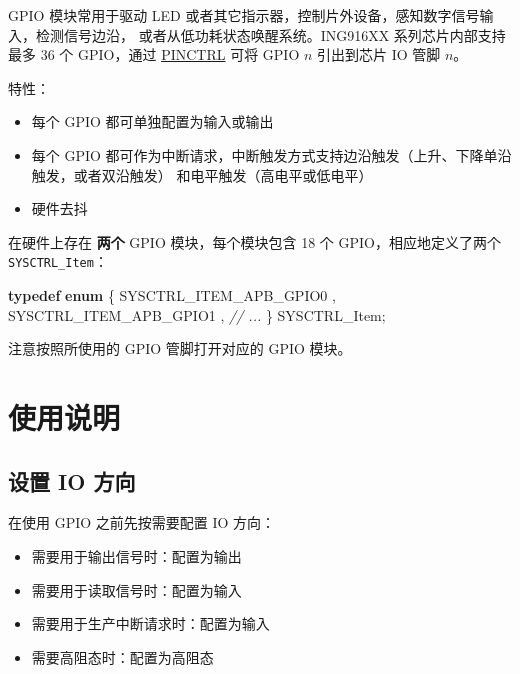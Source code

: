 \documentclass[
  12pt,
]{book}
\makeatletter
\newenvironment{Shaded}{\begin{snugshade}}{\end{snugshade}}
\newcommand{\CommentTok}[1]{\textcolor[rgb]{0.56,0.35,0.01}{\textit{#1}}}
\newcommand{\KeywordTok}[1]{\textcolor[rgb]{0.13,0.29,0.53}{\textbf{#1}}}
\newcommand{\NormalTok}[1]{#1}
\providecommand{\tightlist}{%
  \setlength{\itemsep}{0pt}\setlength{\parskip}{0pt}}
\newenvironment{kframe}{%
\medskip{}
\setlength{\fboxsep}{.8em}
 \def\at@end@of@kframe{}%
 \ifinner\ifhmode%
  \def\at@end@of@kframe{\end{minipage}}%
  \begin{minipage}{\columnwidth}%
 \fi\fi%
 \def\FrameCommand##1{\hskip\@totalleftmargin \hskip-\fboxsep
 \colorbox{shadecolor}{##1}\hskip-\fboxsep
     \hskip-\linewidth \hskip-\@totalleftmargin \hskip\columnwidth}%
 \MakeFramed {\advance\hsize-\width
   \@totalleftmargin\z@ \linewidth\hsize
   \@setminipage}}%
 {\par\unskip\endMakeFramed%
 \at@end@of@kframe}
\newenvironment{rmdblock}[1]
  {
  \begin{itemize}
  \renewcommand{\labelitemi}{
    \raisebox{-.7\height}[0pt][0pt]{
      {\setkeys{Gin}{width=3em,keepaspectratio}\texttt{[image: images/\#1]}}
    }
  }
  \setlength{\fboxsep}{1em}
  \begin{kframe}
  \item
  }
  {
  \end{kframe}
  \end{itemize}
  }
\newenvironment{rmdcaution}
  {\begin{rmdblock}{caution}}
  {\end{rmdblock}}
\makeatother
\begin{document}
GPIO 模块常用于驱动 LED 或者其它指示器，控制片外设备，感知数字信号输入，检测信号边沿，
或者从低功耗状态唤醒系统。ING916XX 系列芯片内部支持最多 36 个 GPIO，通过 \protect\hyperlink{ch-pinctrl}{PINCTRL}
可将 GPIO \(n\) 引出到芯片 IO 管脚 \(n\)。

特性：

\begin{itemize}
\tightlist
\item
  每个 GPIO 都可单独配置为输入或输出
\item
  每个 GPIO 都可作为中断请求，中断触发方式支持边沿触发（上升、下降单沿触发，或者双沿触发）
  和电平触发（高电平或低电平）
\item
  硬件去抖
\end{itemize}

在硬件上存在 \textbf{两个} GPIO 模块，每个模块包含 18 个 GPIO，相应地定义了两个 \texttt{SYSCTRL\_Item}：

\begin{Shaded}
\begin{Highlighting}[]
\KeywordTok{typedef} \KeywordTok{enum}
\NormalTok{\{}
\NormalTok{    SYSCTRL_ITEM_APB_GPIO0     ,}
\NormalTok{    SYSCTRL_ITEM_APB_GPIO1     ,}
    \CommentTok{// ...}
\NormalTok{\} SYSCTRL_Item;}
\end{Highlighting}
\end{Shaded}

\begin{rmdcaution}
注意按照所使用的 GPIO 管脚打开对应的 GPIO 模块。
\end{rmdcaution}

\hypertarget{ux4f7fux7528ux8bf4ux660e-1}{%
\section{使用说明}\label{ux4f7fux7528ux8bf4ux660e-1}}

\hypertarget{ux8bbeux7f6e-io-ux65b9ux5411}{%
\subsection{设置 IO 方向}\label{ux8bbeux7f6e-io-ux65b9ux5411}}

在使用 GPIO 之前先按需要配置 IO 方向：

\begin{itemize}
\tightlist
\item
  需要用于输出信号时：配置为输出
\item
  需要用于读取信号时：配置为输入
\item
  需要用于生产中断请求时：配置为输入
\item
  需要高阻态时：配置为高阻态
\end{itemize}
\end{document}
